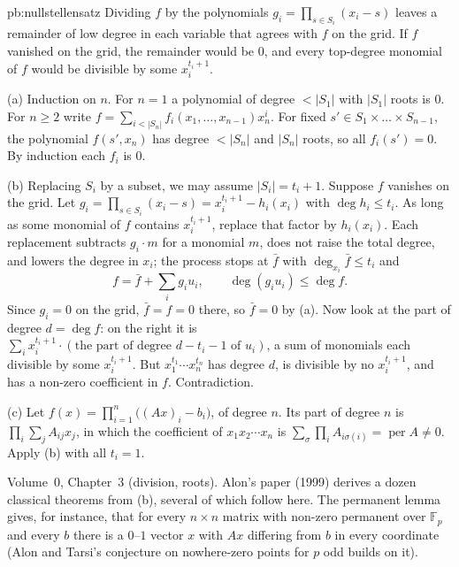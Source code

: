 \begin{solution}{pb:nullstellensatz}
\idea Dividing $f$ by the polynomials $g_i=\prod_{s\in S_i}(x_i-s)$ leaves a remainder of low degree in each variable that agrees
with $f$ on the grid. If $f$ vanished on the grid, the remainder would be $0$, and every top-degree monomial of $f$ would be
divisible by some $x_i^{t_i+1}$.

\writeup (a) Induction on $n$. For $n=1$ a polynomial of degree $<|S_1|$ with $|S_1|$ roots is $0$. For $n\ge2$ write
$f=\sum_{i<|S_n|}f_i(x_1,\dots,x_{n-1})x_n^i$. For fixed $s'\in S_1\times\dots\times S_{n-1}$, the polynomial $f(s',x_n)$ has degree
$<|S_n|$ and $|S_n|$ roots, so all $f_i(s')=0$. By induction each $f_i$ is $0$.

(b) Replacing $S_i$ by a subset, we may assume $|S_i|=t_i+1$. Suppose $f$ vanishes on the grid. Let
$g_i=\prod_{s\in S_i}(x_i-s)=x_i^{t_i+1}-h_i(x_i)$ with $\deg h_i\le t_i$. As long as some monomial of $f$ contains $x_i^{t_i+1}$,
replace that factor by $h_i(x_i)$. Each replacement subtracts $g_i\cdot m$ for a monomial $m$, does not raise the total degree, and
lowers the degree in $x_i$; the process stops at $\bar f$ with $\deg_{x_i}\bar f\le t_i$ and
\[
f=\bar f+\sum_ig_iu_i,\qquad\deg(g_iu_i)\le\deg f.
\]
Since $g_i=0$ on the grid, $\bar f=f=0$ there, so $\bar f=0$ by (a). Now look at the part of degree $d=\deg f$: on the right it is
$\sum_ix_i^{t_i+1}\cdot(\text{the part of degree }d-t_i-1\text{ of }u_i)$, a sum of monomials each divisible by some
$x_i^{t_i+1}$. But $x_1^{t_1}\cdots x_n^{t_n}$ has degree $d$, is divisible by no $x_i^{t_i+1}$, and has a non-zero coefficient in $f$.
Contradiction.

(c) Let $f(x)=\prod_{i=1}^n\bigl((Ax)_i-b_i\bigr)$, of degree $n$. Its part of degree $n$ is $\prod_i\sum_jA_{ij}x_j$, in which the
coefficient of $x_1x_2\cdots x_n$ is $\sum_\sigma\prod_iA_{i\sigma(i)}=\operatorname{per}A\ne0$. Apply (b) with all $t_i=1$.

\tools Volume~0, Chapter~3 (division, roots).
\leads Alon's paper (1999) derives a dozen classical theorems from (b), several of which follow here. The permanent lemma gives,
for instance, that for every $n\times n$ matrix with non-zero permanent over $\mathbb F_p$ and every $b$ there is a $0$--$1$ vector
$x$ with $Ax$ differing from $b$ in every coordinate (Alon and Tarsi's conjecture on nowhere-zero points for $p$ odd builds on it).
\end{solution}

